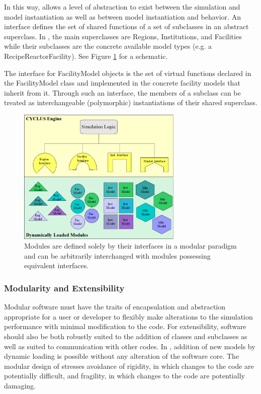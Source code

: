 In this way, \Cyclus allows a level of abstraction to exist between the 
simulation and model instantiation as well as between model instantiation and 
behavior.  An interface defines the set of shared functions of a set of 
subclasses in an abstract superclass. In \Cyclus, the main superclasses are 
Regions, Institutions, and Facilities while their subclasses are the concrete 
available model types (e.g. a RecipeReactorFacility). See Figure 
\ref{fig:modularity} for a schematic.

The interface for FacilityModel objects is the set of 
virtual functions declared in the FacilityModel class and implemented in the 
concrete facility models that inherit from it. Through 
such an interface, the members of a subclass can be treated as 
interchangeable (polymorphic) instantiations of their shared 
superclass. 

\begin{figure}[htb!]
  \begin{center}
    \includegraphics[width=0.7\textwidth]{./chapters/paradigm/modularity.png}
  \end{center}
  \caption[Module Interfaces and Encapsulation in \Cyclus.]{Modules are defined solely 
  by their interfaces in a modular paradigm and can be arbitrarily 
  interchanged with modules possessing equivalent interfaces.}
  \label{fig:modularity}
\end{figure}


\subsubsection{Modularity and Extensibility}

Modular software must have the traits of encapsulation and abstraction 
appropriate for a user or developer to flexibly make alterations to 
the simulation performance with minimal modification to the code. For 
extensibility, software should also be both robustly suited to the addition of 
classes and subclasses as well as suited to communication with other codes.
In \Cyclus, addition of new models by dynamic loading is possible without 
any alteration of the software core. The modular design of \Cyclus stresses
avoidance of rigidity, in which changes to the code are potentially difficult, 
and fragility, in which changes to the code are potentially damaging.

